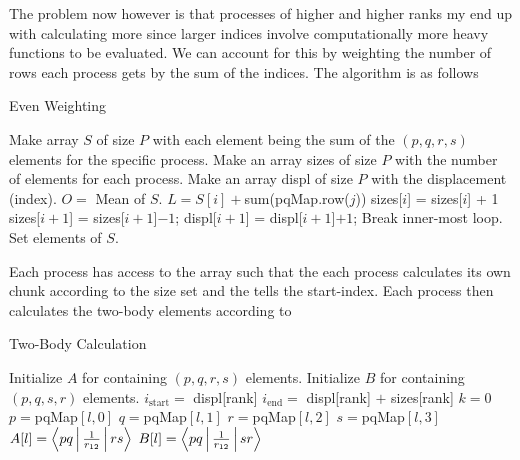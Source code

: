     The problem now however is that processes of higher and higher ranks my end
    up with calculating more since larger indices involve computationally more
    heavy functions to be evaluated. We can account for this by weighting the
    number of rows each process gets by the sum of the indices. The algorithm
    is as follows
        \begin{algorithm}[H]
            \caption{Even Weighting}\label{alg:parasumweight}
            \begin{algorithmic}[H]
                \State Make array $S$ of size $P$ with each element being the
                sum of the $(p,q,r,s)$ elements for the specific process.
                \State Make an array sizes of size $P$ with the number of
                elements for each process.
                \State Make an array displ of size $P$ with the displacement
                (index).
                \State $O =$ Mean of $S$.
                        \State $L = S[i] + $sum(pqMap.row($j$))
                            \State sizes[$i$] = sizes[$i$] + 1
                            \State sizes[$i+1$] = sizes[$i+1$]$ - 1$;
                            \State displ[$i+1$] = displ[$i+1$]$ + 1$;
                            \State Break inner-most loop.
                        \EndIf
                    \EndFor
                    \State Set elements of $S$.
                \EndFor
            \end{algorithmic}
        \end{algorithm}
    Each process has access to the  array such that the each
    process calculates its own chunk according to the size set and the
     tells the start-index. Each process then calculates the
    two-body elements according to
        \begin{algorithm}[H]
            \caption{Two-Body Calculation}\label{alg:paratwobody}
            \begin{algorithmic}[H]
                \State Initialize $A$ for containing $(p,q,r,s)$ elements.
                \State Initialize $B$ for containing $(p,q,s,r)$ elements.
                \State $i_{\text{start}} =$ displ[rank]
                \State $i_{\text{end}} =$ displ[rank] $+$ sizes[rank]
                \State $k=0$
                    \State $p=$pqMap$[l,0]$
                    \State $q=$pqMap$[l,1]$
                    \State $r=$pqMap$[l,2]$
                    \State $s=$pqMap$[l,3]$
                    \State $A[l]=\Braket{pq|\frac{1}{r_{12}}|rs}$
                    \State $B[l]=\Braket{pq|\frac{1}{r_{12}}|sr}$
                \EndFor
            \end{algorithmic}
        \end{algorithm}
